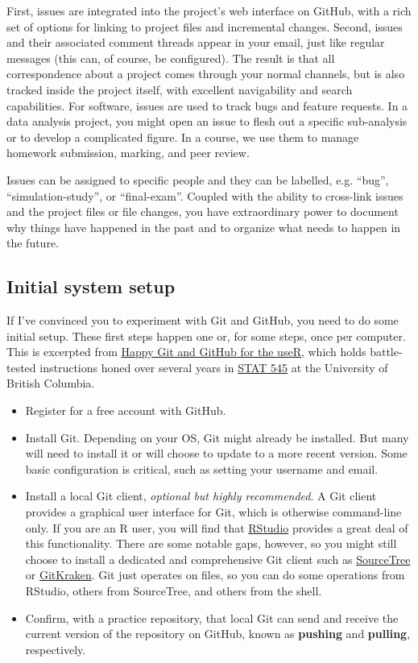 \documentclass[12pt]{article}
\begin{document}
First, issues are integrated into the project's web interface on GitHub,
with a rich set of options for linking to project files and incremental
changes. Second, issues and their associated comment threads appear in
your email, just like regular messages (this can, of course, be
configured). The result is that all correspondence about a project comes
through your normal channels, but is also tracked inside the project
itself, with excellent navigability and search capabilities. For
software, issues are used to track bugs and feature requests. In a data
analysis project, you might open an issue to flesh out a specific
sub-analysis or to develop a complicated figure. In a course, we use
them to manage homework submission, marking, and peer review.

Issues can be assigned to specific people and they can be labelled, e.g.
``bug'', ``simulation-study'', or ``final-exam''. Coupled with the
ability to cross-link issues and the project files or file changes, you
have extraordinary power to document why things have happened in the
past and to organize what needs to happen in the future.

\subsection{Initial system setup}\label{initial-system-setup}

If I've convinced you to experiment with Git and GitHub, you need to do
some initial setup. These first steps happen one or, for some steps,
once per computer. This is excerpted from
\href{http://happygitwithr.com}{Happy Git and GitHub for the useR},
which holds battle-tested instructions honed over several years in
\href{http://stat545.com}{STAT 545} at the University of British
Columbia.

\begin{itemize}
\item
  Register for a free account with GitHub.
\item
  Install Git. Depending on your OS, Git might already be installed. But
  many will need to install it or will choose to update to a more recent
  version. Some basic configuration is critical, such as setting your
  username and email.
\item
  Install a local Git client, \emph{optional but highly recommended}. A
  Git client provides a graphical user interface for Git, which is
  otherwise command-line only. If you are an R user, you will find that
  \href{https://www.rstudio.com/products/rstudio-desktop/}{RStudio}
  provides a great deal of this functionality. There are some notable
  gaps, however, so you might still choose to install a dedicated and
  comprehensive Git client such as
  \href{https://www.sourcetreeapp.com}{SourceTree} or
  \href{https://www.gitkraken.com}{GitKraken}. Git just operates on
  files, so you can do some operations from RStudio, others from
  SourceTree, and others from the shell.
\item
  Confirm, with a practice repository, that local Git can send and
  receive the current version of the repository on GitHub, known as
  \textbf{pushing} and \textbf{pulling}, respectively.
\end{itemize}
\end{document}
